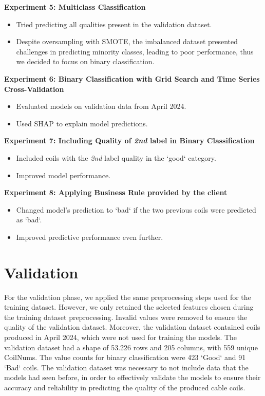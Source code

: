 \textbf{Experiment 5: Multiclass Classification}
\begin{itemize}
    \item Tried predicting all qualities present in the validation dataset.
    \item Despite oversampling with SMOTE, the imbalanced dataset presented challenges in
          predicting minority classes, leading to poor performance, thus we decided to
          focus on binary classification.
\end{itemize}

\textbf{Experiment 6: Binary Classification with Grid Search and Time Series Cross-Validation}
\begin{itemize}
    \item Evaluated models on validation data from April 2024.
    \item Used SHAP to explain model predictions.
\end{itemize}

\textbf{Experiment 7: Including Quality of \emph{2nd} label in Binary Classification}
\begin{itemize}
    \item Included coils with the \emph{2nd} label quality in the `good` category.
    \item Improved model performance.
\end{itemize}

\textbf{Experiment 8: Applying Business Rule provided by the client}
\begin{itemize}
    \item Changed model's prediction to `bad` if the two previous coils were predicted as
          `bad`.
    \item Improved predictive performance even further.
\end{itemize}

\section{Validation}

For the validation phase, we applied the same preprocessing steps used for the
training dataset. However, we only retained the selected features chosen during
the training dataset preprocessing. Invalid values were removed to ensure the
quality of the validation dataset. Moreover, the validation dataset contained
coils produced in April 2024, which were not used for training the models. The
validation dataset had a shape of 53.226 rows and 205 columns, with 559 unique
CoilNums. The value counts for binary classification were 423 `Good` and 91
`Bad` coils. The validation dataset was necessary to not include data that the
models had seen before, in order to effectively validate the models to ensure
their accuracy and reliability in predicting the quality of the produced cable
coils.

